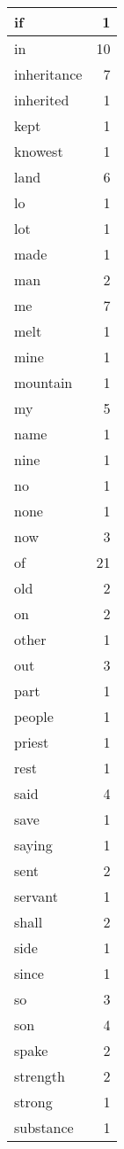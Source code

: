 \begin{center}
\begin{longtable}{l|r}
if & 1\\ \hline 
in & 10\\ \hline 
inheritance & 7\\ \hline 
inherited & 1\\ \hline 
kept & 1\\ \hline 
knowest & 1\\ \hline 
land & 6\\ \hline 
lo & 1\\ \hline 
lot & 1\\ \hline 
made & 1\\ \hline 
man & 2\\ \hline 
me & 7\\ \hline 
melt & 1\\ \hline 
mine & 1\\ \hline 
mountain & 1\\ \hline 
my & 5\\ \hline 
name & 1\\ \hline 
nine & 1\\ \hline 
no & 1\\ \hline 
none & 1\\ \hline 
now & 3\\ \hline 
of & 21\\ \hline 
old & 2\\ \hline 
on & 2\\ \hline 
other & 1\\ \hline 
out & 3\\ \hline 
part & 1\\ \hline 
people & 1\\ \hline 
priest & 1\\ \hline 
rest & 1\\ \hline 
said & 4\\ \hline 
save & 1\\ \hline 
saying & 1\\ \hline 
sent & 2\\ \hline 
servant & 1\\ \hline 
shall & 2\\ \hline 
side & 1\\ \hline 
since & 1\\ \hline 
so & 3\\ \hline 
son & 4\\ \hline 
spake & 2\\ \hline 
strength & 2\\ \hline 
strong & 1\\ \hline 
substance & 1\\ \hline 

\end{longtable}
\end{center}
